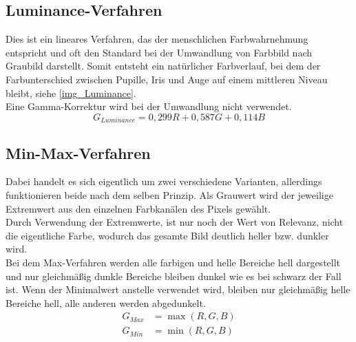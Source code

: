 \subsection{Luminance-Verfahren}
\label{gray_Luminance}
Dies ist ein lineares Verfahren, das der menschlichen Farbwahrnehmung entspricht und oft den Standard bei der Umwandlung von Farbbild nach Graubild darstellt. Somit entsteht ein natürlicher Farbverlauf, bei dem der Farbunterschied zwischen Pupille, Iris und Auge auf einem mittleren Niveau bleibt, siehe \autoref{img_Luminance}.\\
Eine Gamma-Korrektur wird bei der Umwandlung nicht verwendet.\cite{rgb_to_Gray}
\[G_{Luminance} = 0,299 R + 0,587 G + 0,114 B\]
\subsection{Min-Max-Verfahren}
\label{gray_MinMax}
Dabei handelt es sich eigentlich um zwei verschiedene Varianten, allerdings funktionieren beide nach dem selben Prinzip. Als Grauwert wird der jeweilige Extremwert aus den einzelnen Farbkanälen des Pixels gewählt.\\
Durch Verwendung der Extremwerte, ist nur noch der Wert von Relevanz, nicht die eigentliche Farbe, wodurch das gesamte Bild deutlich heller bzw. dunkler wird.\\
Bei dem Max-Verfahren werden alle farbigen und helle Bereiche hell dargestellt und nur gleichmäßig dunkle Bereiche bleiben dunkel wie es bei schwarz der Fall ist. Wenn der Minimalwert anstelle verwendet wird, bleiben nur gleichmäßig helle Bereiche hell, alle anderen werden abgedunkelt.
\begin{align*}
G_{Max} &= \max(R,G,B)\\
G_{Min} &= \min(R,G,B)
\end{align*}
